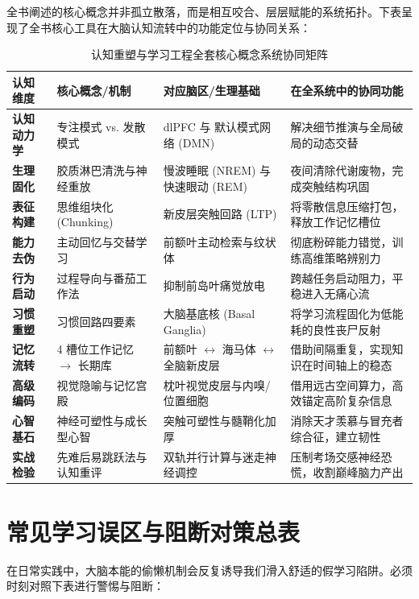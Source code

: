 \documentclass[12pt,a4paper,openany]{ctexbook}
\begin{document}
全书阐述的核心概念并非孤立散落，而是相互咬合、层层赋能的系统拓扑。下表呈现了全书核心工具在大脑认知流转中的功能定位与协同关系：

\begin{table}[H]
\centering
\small
\begin{tabular}{@{}llll@{}}
\toprule
\textbf{认知维度} & \textbf{核心概念/机制} & \textbf{对应脑区/生理基础} & \textbf{在全系统中的协同功能} \\ \midrule
\textbf{认知动力学} & 专注模式 vs. 发散模式 & dlPFC 与 默认模式网络 (DMN) & 解决细节推演与全局破局的动态交替 \\
\textbf{生理固化} & 胶质淋巴清洗与神经重放 & 慢波睡眠 (NREM) 与快速眼动 (REM) & 夜间清除代谢废物，完成突触结构巩固 \\
\textbf{表征构建} & 思维组块化 (Chunking) & 新皮层突触回路 (LTP) & 将零散信息压缩打包，释放工作记忆槽位 \\
\textbf{能力去伪} & 主动回忆与交替学习 & 前额叶主动检索与纹状体 & 彻底粉碎能力错觉，训练高维策略辨别力 \\
\textbf{行为启动} & 过程导向与番茄工作法 & 抑制前岛叶痛觉放电 & 跨越任务启动阻力，平稳进入无痛心流 \\
\textbf{习惯重塑} & 习惯回路四要素 & 大脑基底核 (Basal Ganglia) & 将学习流程固化为低能耗的良性丧尸反射 \\
\textbf{记忆流转} & 4 槽位工作记忆 $\rightarrow$ 长期库 & 前额叶 $\leftrightarrow$ 海马体 $\leftrightarrow$ 全脑新皮层 & 借助间隔重复，实现知识在时间轴上的稳态 \\
\textbf{高级编码} & 视觉隐喻与记忆宫殿 & 枕叶视觉皮层与内嗅/位置细胞 & 借用远古空间算力，高效锚定高阶复杂信息 \\
\textbf{心智基石} & 神经可塑性与成长型心智 & 突触可塑性与髓鞘化加厚 & 消除天才羡慕与冒充者综合征，建立韧性 \\
\textbf{实战检验} & 先难后易跳跃法与认知重评 & 双轨并行计算与迷走神经调控 & 压制考场交感神经恐慌，收割巅峰脑力产出 \\ \bottomrule
\end{tabular}
\caption{认知重塑与学习工程全套核心概念系统协同矩阵}
\end{table}

\section{常见学习误区与阻断对策总表}

在日常实践中，大脑本能的偷懒机制会反复诱导我们滑入舒适的假学习陷阱。必须时刻对照下表进行警惕与阻断：
\end{document}
